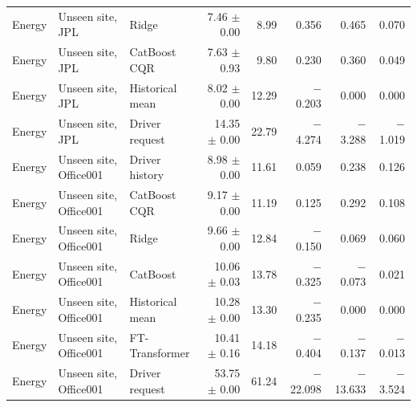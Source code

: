 {\begin{longtable}{lllrrrrr}
Energy & Unseen site, JPL & Ridge & 7.46 $\pm$ 0.00 & 8.99 & 0.356 & 0.465 & 0.070 \\
Energy & Unseen site, JPL & CatBoost CQR & 7.63 $\pm$ 0.93 & 9.80 & 0.230 & 0.360 & 0.049 \\
Energy & Unseen site, JPL & Historical mean & 8.02 $\pm$ 0.00 & 12.29 & $-$0.203 & 0.000 & 0.000 \\
Energy & Unseen site, JPL & Driver request & 14.35 $\pm$ 0.00 & 22.79 & $-$4.274 & $-$3.288 & $-$1.019 \\
Energy & Unseen site, Office001 & Driver history & 8.98 $\pm$ 0.00 & 11.61 & 0.059 & 0.238 & 0.126 \\
Energy & Unseen site, Office001 & CatBoost CQR & 9.17 $\pm$ 0.00 & 11.19 & 0.125 & 0.292 & 0.108 \\
Energy & Unseen site, Office001 & Ridge & 9.66 $\pm$ 0.00 & 12.84 & $-$0.150 & 0.069 & 0.060 \\
Energy & Unseen site, Office001 & CatBoost & 10.06 $\pm$ 0.03 & 13.78 & $-$0.325 & $-$0.073 & 0.021 \\
Energy & Unseen site, Office001 & Historical mean & 10.28 $\pm$ 0.00 & 13.30 & $-$0.235 & 0.000 & 0.000 \\
Energy & Unseen site, Office001 & FT-Transformer & 10.41 $\pm$ 0.16 & 14.18 & $-$0.404 & $-$0.137 & $-$0.013 \\
Energy & Unseen site, Office001 & Driver request & 53.75 $\pm$ 0.00 & 61.24 & $-$22.098 & $-$13.633 & $-$3.524 \\
\end{longtable}}

